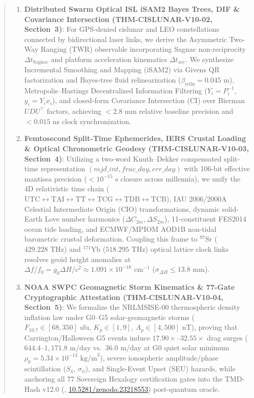 \documentclass[11pt,a4paper,reqno]{article}
\def\bm#1{#1}%
\def\texttt#1{#1}%
\newcommand{\zenodo}[1]{\href{https://doi.org/10.5281/zenodo.#1}{\texttt{10.5281/\allowbreak zenodo.#1}}}
\theoremstyle{plain}
\theoremstyle{definition}
\theoremstyle{remark}
\numberwithin{equation}{section}
\begin{document}
\begin{abstract}
\begin{enumerate}[leftmargin=1.8em,itemsep=2pt,topsep=4pt]
  \item \textbf{Distributed Swarm Optical ISL iSAM2 Bayes Trees, DIF \& Covariance Intersection (\texttt{THM-CISLUNAR-V10-02}, Section~3)}: For GPS-denied cislunar and LEO constellations connected by bidirectional laser links, we derive the Asymmetric Two-Way Ranging (TWR) observable incorporating Sagnac non-reciprocity $\Delta t_{\text{Sagnac}}$ and platform acceleration kinematics $\Delta t_{\text{acc}}$. We synthesize Incremental Smoothing and Mapping (iSAM2) via Givens QR factorization and Bayes-tree fluid relinearization ($\beta_{\text{relin}} = 0.045\text{ m}$), Metropolis--Hastings Decentralized Information Filtering ($\bm{Y}_i = \bm{P}_i^{-1}$, $\bm{y}_i = \bm{Y}_i \bm{x}_i$), and closed-form Covariance Intersection (CI) over Bierman $\bm{U}\bm{D}\bm{U}^\top$ factors, achieving $< 2.8\text{ mm}$ relative baseline precision and $< 0.015\text{ ns}$ clock synchronization.
  \item \textbf{Femtosecond Split-Time Ephemerides, IERS Crustal Loading \& Optical Chronometric Geodesy (\texttt{THM-CISLUNAR-V10-03}, Section~4)}: Utilizing a two-word Knuth--Dekker compensated split-time representation $(\texttt{mjd\_int}, \texttt{frac\_day}, \texttt{err\_day})$ with 106-bit effective mantissa precision ($< 10^{-15}\text{ s}$ closure across millennia), we unify the 4D relativistic time chain ($\text{UTC} \leftrightarrow \text{TAI} \leftrightarrow \text{TT} \leftrightarrow \text{TCG} \leftrightarrow \text{TDB} \leftrightarrow \text{TCB}$), IAU 2006/2000A Celestial Intermediate Origin (CIO) transformations, dynamic solid-Earth Love number harmonics ($\Delta C_{2m}, \Delta S_{2m}$), 11-constituent FES2014 ocean tide loading, and ECMWF/MPIOM AOD1B non-tidal barometric crustal deformation. Coupling this frame to $^{87}\text{Sr}$ ($429.228\text{ THz}$) and $^{171}\text{Yb}$ ($518.295\text{ THz}$) optical lattice clock links resolves geoid height anomalies at $\Delta f / f_0 = g_0 \Delta H / c^2 \approx 1.091 \times 10^{-18}\text{ cm}^{-1}$ ($\sigma_{\Delta H} \le 13.8\text{ mm}$).
  \item \textbf{NOAA SWPC Geomagnetic Storm Kinematics \& 77-Gate Cryptographic Attestation (\texttt{THM-CISLUNAR-V10-04}, Section~5)}: We formalize the NRLMSISE-00 thermospheric density inflation law under G0--G5 solar-geomagnetic storms ($F_{10.7} \in [68, 350]\text{ sfu}$, $K_p \in [1, 9]$, $A_p \in [4, 500]\text{ nT}$), proving that Carrington/Halloween G5 events induce $17.90\times$--$32.55\times$ drag surges ($644.4$--$1,171.8\text{ m/day}$ vs.\ $36.0\text{ m/day}$ at G0 quiet solar minimum $\rho_0 = 5.34 \times 10^{-13}\text{ kg/m}^3$), severe ionospheric amplitude/phase scintillation ($S_4$, $\sigma_\phi$), and Single-Event Upset (SEU) hazards, while anchoring all 77 Sovereign Hexalogy certification gates into the TMD-Hash v12.0 (\cite{UnmaniTMD12}, \zenodo{23218553}) post-quantum oracle.
\end{enumerate}


\end{abstract}
\end{document}
